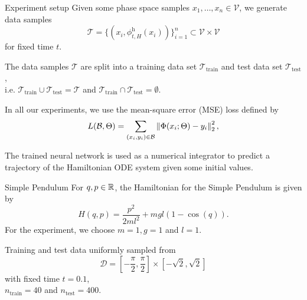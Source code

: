 \begin{frame}{Experiment setup}
  Given some phase space samples $x_1, \dots, x_n \in \mathcal{V}$, we generate data samples 
  \begin{equation*}
    \mathcal{T} = \{ (x_i, \phi^{\text{h}}_{t,H}(x_i)) \}_{i=1}^{n}
    \subset \mathcal{V} \times \mathcal{V}
  \end{equation*}
  for fixed time $t$.

  \vspace{0.3cm}
  The data samples $\mathcal{T}$ are split into a training data set 
  $\mathcal{T}_{\text{train}}$ and test data set $\mathcal{T}_{\text{test}}$,\\
  i.e. $\mathcal{T}_{\text{train}} \cup \mathcal{T}_{\text{test}} = \mathcal{T}$
  and $\mathcal{T}_{\text{train}} \cap \mathcal{T}_{\text{test}} = \emptyset$.

  \vspace{0.6cm}
  In all our experiments, we use the mean-square error (MSE) loss defined by
  \begin{equation*}
    L(\mathcal{B}, \Theta) = \sum_{(x_i, y_i) \in \mathcal{B}} \left\lVert{\Phi(x_i; \Theta) - y_i}\right\rVert^2_2
    ,
  \end{equation*}

   The trained neural network is used as a numerical integrator
  to predict a trajectory of the Hamiltonian ODE system given some initial values.
\end{frame}

\begin{frame}[c]{Simple Pendulum}
  For $q,p \in \mathbb{R}$, the Hamiltonian for the Simple Pendulum is given by
  \begin{equation*}
    H(q,p) = \frac{p^2}{2ml^2} + mgl (1-\cos(q))
    .
  \end{equation*}
  For the experiment, we choose $m=1, g=1$ and $l=1$.

  \vspace{0.6cm}
  Training and test data uniformly sampled from
  \begin{equation*}
    \mathcal{D} = [-\frac{\pi}{2}, \frac{\pi}{2}] \times [-\sqrt{2}, \sqrt{2}]
  \end{equation*}
  with fixed time $t = 0.1$,\\
  $n_{\text{train}} = 40$ and $n_{\text{test}} = 400$.
\end{frame}

